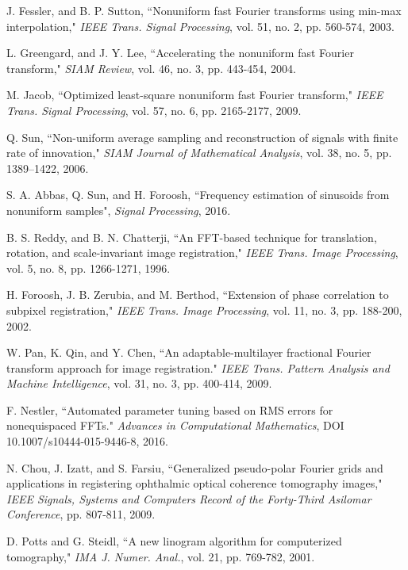 \documentclass{UCF_ETD}
\begin{document}
\begin{thebibliography}{99}
J. Fessler, and B. P. Sutton, ``Nonuniform fast Fourier transforms using min-max interpolation," \emph{IEEE Trans. Signal Processing}, vol. 51, no. 2, pp. 560-574, 2003.

L. Greengard, and J. Y. Lee, ``Accelerating the nonuniform fast Fourier transform," \emph{SIAM Review}, vol. 46, no. 3, pp. 443-454, 2004.

M. Jacob, ``Optimized least-square nonuniform fast Fourier transform," \emph{IEEE Trans. Signal Processing}, vol. 57, no. 6, pp. 2165-2177, 2009.


Q. Sun, ``Non-uniform average sampling and reconstruction of signals with finite rate of innovation," {\em SIAM Journal of Mathematical Analysis}, { vol. 38}, no. 5,  pp. 1389--1422, 2006.

S. A. Abbas, Q. Sun, and H. Foroosh, ``Frequency estimation of sinusoids from nonuniform samples", {\emph{Signal Processing}}, 2016.


B. S. Reddy, and B. N. Chatterji, ``An FFT-based technique for translation, rotation, and scale-invariant image registration," \emph{IEEE Trans. Image Processing}, vol. 5, no. 8, pp. 1266-1271, 1996.

H. Foroosh, J. B. Zerubia, and M. Berthod, ``Extension of phase correlation to subpixel registration," {\emph{IEEE Trans. Image Processing}}, vol. 11, no. 3, pp. 188-200, 2002.


W. Pan,  K. Qin, and Y. Chen, ``An adaptable-multilayer fractional Fourier transform approach for image registration." \emph{IEEE Trans. Pattern Analysis and Machine Intelligence}, vol. 31, no. 3, pp. 400-414, 2009.


F. Nestler, ``Automated parameter tuning based on RMS errors for nonequispaced FFTs." \emph{Advances in Computational Mathematics}, DOI 10.1007/s10444-015-9446-8, 2016.

N. Chou, J. Izatt, and S. Farsiu, ``Generalized pseudo-polar Fourier grids and applications in registering ophthalmic optical coherence tomography images," \emph{IEEE Signals, Systems and Computers Record of the Forty-Third Asilomar Conference}, pp. 807-811, 2009.


D. Potts and G. Steidl, ``A new linogram algorithm for computerized tomography," \emph{IMA J. Numer. Anal.}, vol. 21, pp. 769-782, 2001.


\end{thebibliography}
\end{document}
